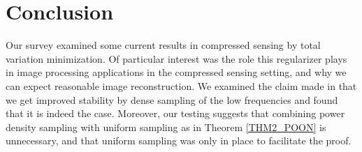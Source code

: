 \documentclass[11pt, oneside]{article}   %
\begin{document}
%
% 
\section{Conclusion}
Our survey examined some current results in compressed sensing by 
total variation minimization. Of particular interest was the role this 
regularizer plays in image processing applications in the compressed sensing 
setting, and why we can expect reasonable image reconstruction.  We examined the claim made in \cite{poon2015tv} that we get improved stability by dense sampling of the low frequencies and found that it is indeed the case. Moreover, our testing suggests that combining power density sampling with uniform sampling as in Theorem \ref{THM2_POON} is unnecessary, and that uniform sampling was only in place to facilitate the proof.
\end{document}
